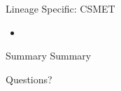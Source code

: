 \documentclass[10pt]{beamer}
\begin{document}
\begin{frame}[fragile]{Lineage Specific: CSMET}
\begin{itemize}
\item 
\end{itemize}
\end{frame}


\begin{frame}{Summary}
Summary
\end{frame}

\begin{frame}[standout]
  Questions?
\end{frame}

\appendix
\end{document}
